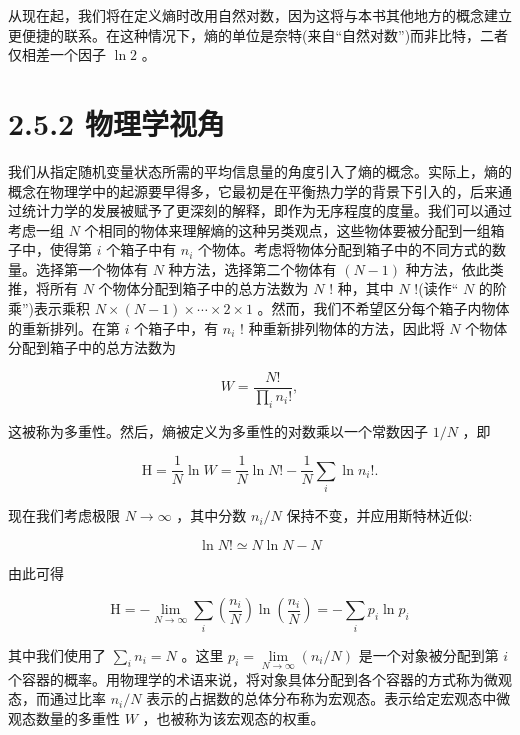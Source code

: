 \documentclass[10pt]{report}
\begin{document}
从现在起，我们将在定义熵时改用自然对数，因为这将与本书其他地方的概念建立更便捷的联系。在这种情况下，熵的单位是奈特(来自“自然对数”)而非比特，二者仅相差一个因子 \(\ln 2\) 。

\section*{2.5.2 物理学视角}

我们从指定随机变量状态所需的平均信息量的角度引入了熵的概念。实际上，熵的概念在物理学中的起源要早得多，它最初是在平衡热力学的背景下引入的，后来通过统计力学的发展被赋予了更深刻的解释，即作为无序程度的度量。我们可以通过考虑一组 \(N\) 个相同的物体来理解熵的这种另类观点，这些物体要被分配到一组箱子中，使得第 \(i\) 个箱子中有 \({n}_{i}\) 个物体。考虑将物体分配到箱子中的不同方式的数量。选择第一个物体有 \(N\) 种方法，选择第二个物体有 \(\left( {N - 1}\right)\) 种方法，依此类推，将所有 \(N\) 个物体分配到箱子中的总方法数为 \(N\) ! 种，其中 \(N\) !(读作“ \(N\) 的阶乘”)表示乘积 \(N \times  \left( {N - 1}\right)  \times  \cdots  \times  2 \times  1\) 。然而，我们不希望区分每个箱子内物体的重新排列。在第 \(i\) 个箱子中，有 \({n}_{i}\) ! 种重新排列物体的方法，因此将 \(N\) 个物体分配到箱子中的总方法数为

\[
W = \frac{N!}{\mathop{\prod }\limits_{i}{n}_{i}!}, \tag{2.82}
\]

这被称为多重性。然后，熵被定义为多重性的对数乘以一个常数因子 \(1/N\) ，即

\[
\mathrm{H} = \frac{1}{N}\ln W = \frac{1}{N}\ln N! - \frac{1}{N}\mathop{\sum }\limits_{i}\ln {n}_{i}!. \tag{2.83}
\]

现在我们考虑极限 \(N \rightarrow  \infty\) ，其中分数 \({n}_{i}/N\) 保持不变，并应用斯特林近似:

\[
\ln N! \simeq  N\ln N - N \tag{2.84}
\]

由此可得

\[
\mathrm{H} =  - \mathop{\lim }\limits_{{N \rightarrow  \infty }}\mathop{\sum }\limits_{i}\left( \frac{{n}_{i}}{N}\right) \ln \left( \frac{{n}_{i}}{N}\right)  =  - \mathop{\sum }\limits_{i}{p}_{i}\ln {p}_{i} \tag{2.85}
\]

其中我们使用了 \(\mathop{\sum }\limits_{i}{n}_{i} = N\) 。这里 \({p}_{i} = \mathop{\lim }\limits_{{N \rightarrow  \infty }}\left( {{n}_{i}/N}\right)\) 是一个对象被分配到第 \(i\) 个容器的概率。用物理学的术语来说，将对象具体分配到各个容器的方式称为微观态，而通过比率 \({n}_{i}/N\) 表示的占据数的总体分布称为宏观态。表示给定宏观态中微观态数量的多重性 \(W\) ，也被称为该宏观态的权重。
\end{document}
